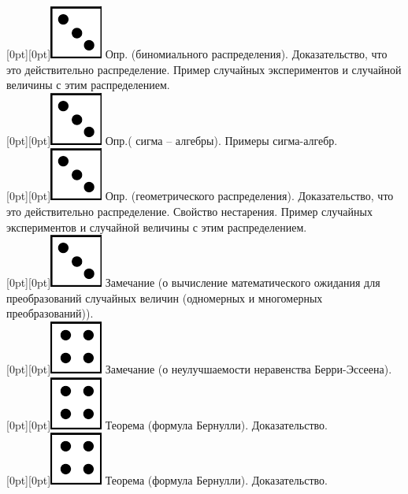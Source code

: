 \documentclass[10pt]{article}
\begin{document}
\raisebox{-1pt}[0pt][0pt]{\includegraphics[width=0.02\linewidth]{3.png}}  Опр. (биномиального распределения). Доказательство, что это действительно распределение. Пример случайных экспериментов и случайной величины с этим распределением. \\     

\raisebox{-1pt}[0pt][0pt]{\includegraphics[width=0.02\linewidth]{3.png}} Опр.( сигма – алгебры). Примеры сигма-алгебр. \\

\raisebox{-1pt}[0pt][0pt]{\includegraphics[width=0.02\linewidth]{3.png}}  Опр. (геометрического распределения). Доказательство, что это действительно распределение. Свойство нестарения. Пример случайных экспериментов и случайной величины с этим распределением. \\      

\raisebox{-1pt}[0pt][0pt]{\includegraphics[width=0.02\linewidth]{3.png}} Замечание (о вычисление  математического ожидания для преобразований случайных величин (одномерных и многомерных преобразований)). \\

\raisebox{-1pt}[0pt][0pt]{\includegraphics[width=0.02\linewidth]{4.png}} Замечание (о неулучшаемости неравенства Берри-Эссеена). \\

\raisebox{-1pt}[0pt][0pt]{\includegraphics[width=0.02\linewidth]{4.png}} Теорема (формула Бернулли). Доказательство. \\

\raisebox{-1pt}[0pt][0pt]{\includegraphics[width=0.02\linewidth]{4.png}} Теорема (формула Бернулли). Доказательство. \\
\end{document}
